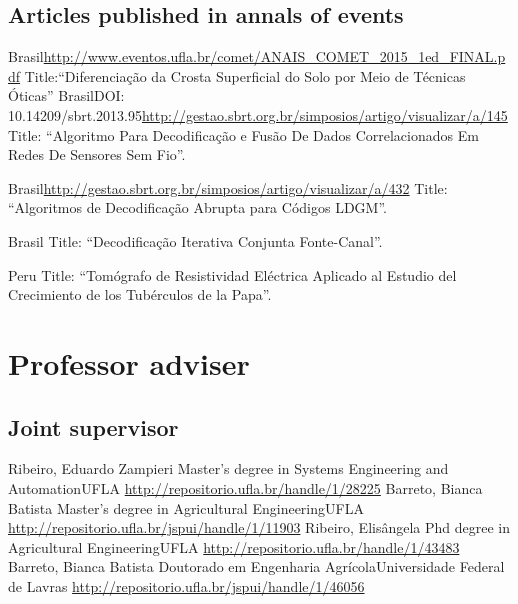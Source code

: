 \documentclass[11pt,a4paper,sans]{moderncv} %
\begin{document}
\subsection{Articles published in annals of events}
	      {Brasil}{}{\url{http://www.eventos.ufla.br/comet/ANAIS\_COMET\_2015\_1ed\_FINAL.pdf}}
	      {Title:``Diferenciação da Crosta Superficial do Solo por Meio de Técnicas Óticas''}
	      {Brasil}{DOI: 10.14209/sbrt.2013.95}{\url{http://gestao.sbrt.org.br/simposios/artigo/visualizar/a/145}}
	      {Title: ``Algoritmo Para Decodificação e Fusão De Dados Correlacionados Em Redes De Sensores Sem Fio''.}

	      {Brasil}{}{\url{http://gestao.sbrt.org.br/simposios/artigo/visualizar/a/432}}
	      {Title: ``Algoritmos de Decodificação Abrupta para Códigos LDGM''.}

	      {Brasil}{}{}%
	      {Title: ``Decodificação Iterativa Conjunta Fonte-Canal''.}

	      {Peru}{}{}
	      {Title: ``Tomógrafo de Resistividad Eléctrica Aplicado al Estudio del Crecimiento de los Tubérculos de la Papa''.}


	       
\section{Professor adviser}
\subsection{Joint supervisor}
			{Ribeiro, Eduardo Zampieri}
			{Master's degree in Systems Engineering and Automation}{UFLA}
			{\url{http://repositorio.ufla.br/handle/1/28225}}
			{Barreto, Bianca Batista}
			{Master's degree in Agricultural Engineering}{UFLA}
			{\url{http://repositorio.ufla.br/jspui/handle/1/11903}}
			{Ribeiro, Elisângela }
			{Phd degree in Agricultural Engineering}{UFLA}
			{\url{http://repositorio.ufla.br/handle/1/43483}}
			{Barreto, Bianca Batista}
			{Doutorado em Engenharia Agrícola}{Universidade Federal de Lavras}
			{\url{http://repositorio.ufla.br/jspui/handle/1/46056}}
\end{document}

